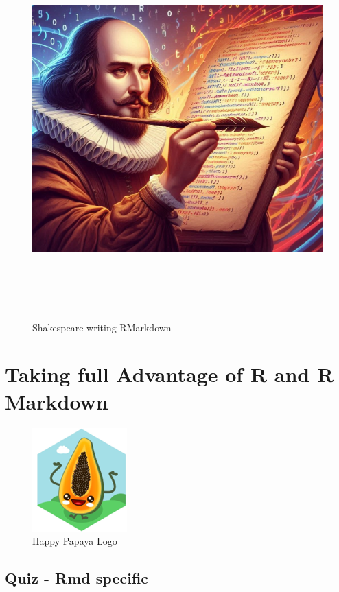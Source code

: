 \documentclass[
]{book}
\begin{document}
\begin{figure}
\centering
\includegraphics[width=\textwidth,height=5.72917in]{img/shakespeare.jpg}
\caption{Shakespeare writing RMarkdown}
\end{figure}

\chapter{Taking full Advantage of R and R Markdown}\label{taking-full-advantage-of-r-and-r-markdown}

\begin{figure}
\centering
\includegraphics{./img/papaja.png}
\caption{Happy Papaya Logo}
\end{figure}

\section{Quiz - Rmd specific}\label{quiz---rmd-specific}
\end{document}
